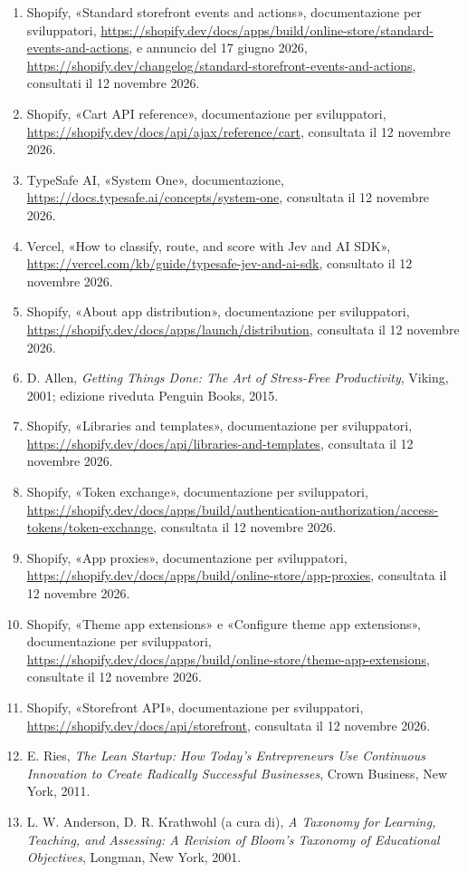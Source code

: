 \begin{enumerate}
	il 12 novembre 2026.
	\item \label{rif:standard-events}Shopify, «Standard storefront events and actions», documentazione
	per sviluppatori, \url{https://shopify.dev/docs/apps/build/online-store/standard-events-and-actions},
	e annuncio del 17 giugno 2026,
	\url{https://shopify.dev/changelog/standard-storefront-events-and-actions}, consultati il 12
	novembre 2026.
	\item \label{rif:ajax-cart}Shopify, «Cart API reference», documentazione per sviluppatori,
	\url{https://shopify.dev/docs/api/ajax/reference/cart}, consultata il 12 novembre 2026.
	\item \label{rif:typesafe-system-one}TypeSafe AI, «System One», documentazione,
	\url{https://docs.typesafe.ai/concepts/system-one}, consultata il 12 novembre 2026.
	\item \label{rif:vercel-jev}Vercel, «How to classify, route, and score with Jev and AI SDK»,
	\url{https://vercel.com/kb/guide/typesafe-jev-and-ai-sdk}, consultato il 12 novembre 2026.
	\item \label{rif:shopify-distribution}Shopify, «About app distribution», documentazione per
	sviluppatori, \url{https://shopify.dev/docs/apps/launch/distribution}, consultata il 12 novembre
	2026.
	\item \label{rif:gtd}D. Allen, \emph{Getting Things Done: The Art of Stress-Free Productivity},
	Viking, 2001; edizione riveduta Penguin Books, 2015.
	\item \label{rif:shopify-templates}Shopify, «Libraries and templates», documentazione per
	sviluppatori, \url{https://shopify.dev/docs/api/libraries-and-templates}, consultata il 12
	novembre 2026.
	\item \label{rif:shopify-token-exchange}Shopify, «Token exchange», documentazione per
	sviluppatori,
	\url{https://shopify.dev/docs/apps/build/authentication-authorization/access-tokens/token-exchange},
	consultata il 12 novembre 2026.
	\item \label{rif:shopify-app-proxy}Shopify, «App proxies», documentazione per sviluppatori,
	\url{https://shopify.dev/docs/apps/build/online-store/app-proxies}, consultata il 12 novembre
	2026.
	\item \label{rif:shopify-theme-extensions}Shopify, «Theme app extensions» e «Configure theme app
	extensions», documentazione per sviluppatori,
	\url{https://shopify.dev/docs/apps/build/online-store/theme-app-extensions}, consultate il 12
	novembre 2026.
	\item \label{rif:shopify-storefront-api}Shopify, «Storefront API», documentazione per
	sviluppatori, \url{https://shopify.dev/docs/api/storefront}, consultata il 12 novembre 2026.
	\item \label{rif:lean-startup}E. Ries, \emph{The Lean Startup: How Today’s Entrepreneurs Use
	Continuous Innovation to Create Radically Successful Businesses}, Crown Business, New York,
	2011.
	\item \label{rif:anderson-bloom}L. W. Anderson, D. R. Krathwohl (a cura di), \emph{A Taxonomy for
	Learning, Teaching, and Assessing: A Revision of Bloom’s Taxonomy of Educational Objectives},
	Longman, New York, 2001.
\end{enumerate}

